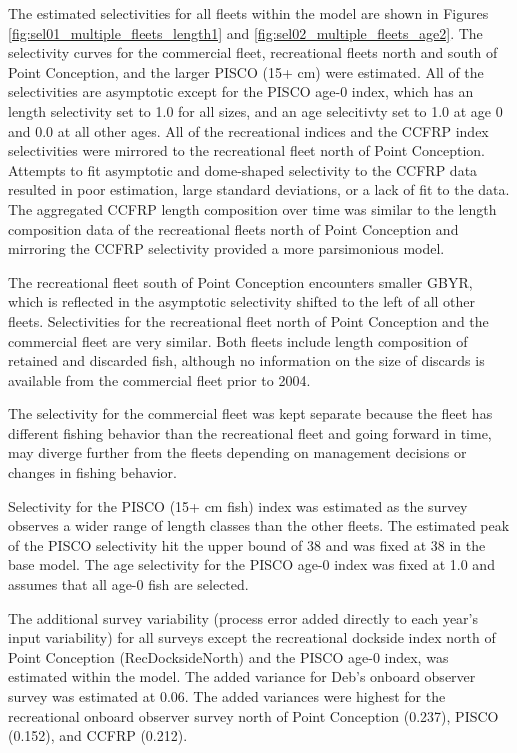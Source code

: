 \documentclass[12pt,]{article}
\begin{document}
The estimated selectivities for all fleets within the model are shown in
Figures \ref{fig:sel01_multiple_fleets_length1} and
\ref{fig:sel02_multiple_fleets_age2}. The selectivity curves for the
commercial fleet, recreational fleets north and south of Point
Conception, and the larger PISCO (15+ cm) were estimated. All of the
selectivities are asymptotic except for the PISCO age-0 index, which has
an length selectivity set to 1.0 for all sizes, and an age selecitivty
set to 1.0 at age 0 and 0.0 at all other ages. All of the recreational
indices and the CCFRP index selectivities were mirrored to the
recreational fleet north of Point Conception. Attempts to fit asymptotic
and dome-shaped selectivity to the CCFRP data resulted in poor
estimation, large standard deviations, or a lack of fit to the data. The
aggregated CCFRP length composition over time was similar to the length
composition data of the recreational fleets north of Point Conception
and mirroring the CCFRP selectivity provided a more parsimonious model.

The recreational fleet south of Point Conception encounters smaller
GBYR, which is reflected in the asymptotic selectivity shifted to the
left of all other fleets. Selectivities for the recreational fleet north
of Point Conception and the commercial fleet are very similar. Both
fleets include length composition of retained and discarded fish,
although no information on the size of discards is available from the
commercial fleet prior to 2004.

The selectivity for the commercial fleet was kept separate because the
fleet has different fishing behavior than the recreational fleet and
going forward in time, may diverge further from the fleets depending on
management decisions or changes in fishing behavior.

Selectivity for the PISCO (15+ cm fish) index was estimated as the
survey observes a wider range of length classes than the other fleets.
The estimated peak of the PISCO selectivity hit the upper bound of 38
and was fixed at 38 in the base model. The age selectivity for the PISCO
age-0 index was fixed at 1.0 and assumes that all age-0 fish are
selected.

The additional survey variability (process error added directly to each
year's input variability) for all surveys except the recreational
dockside index north of Point Conception (RecDocksideNorth) and the
PISCO age-0 index, was estimated within the model. The added variance
for Deb's onboard observer survey was estimated at 0.06. The added
variances were highest for the recreational onboard observer survey
north of Point Conception (0.237), PISCO (0.152), and CCFRP (0.212).
\end{document}
